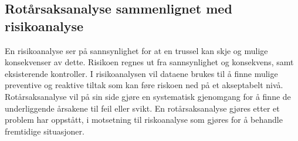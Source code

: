 \subsection{Rotårsaksanalyse sammenlignet med risikoanalyse}
En risikoanalyse ser på sannsynlighet for at en trussel kan skje og mulige konsekvenser av dette. Risikoen regnes ut fra sannsynlighet og konsekvens, samt eksisterende kontroller. I risikoanalysen vil dataene brukes til å finne mulige preventive og reaktive tiltak som kan føre riskoen ned på et akseptabelt nivå. Rotårsaksanalyse vil på sin side gjøre en systematisk gjenomgang for å finne de underliggende årsakene til feil eller svikt. En rotårsaksanalyse gjøres etter et problem har oppstått, i motsetning til riskoanalyse som gjøres for å behandle fremtidige situasjoner. 
